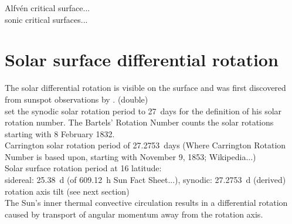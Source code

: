 Alfvén critical surface...\\
sonic critical surfaces...\\







\section{Solar surface differential rotation}
\label{sec:solar_surface_differential_rotation}

The solar differential rotation is visible on the surface and was first discovered from sunspot observations by \citet{Scheiner1630}. (double)\\

\citet{Bartels1934} set the synodic solar rotation period to 27~days for the definition of his solar rotation number. The Bartels' Rotation Number counts the solar rotations starting with 8 February 1832.\\
Carrington solar rotation period of 27.2753~days (Where Carrington Rotation Number is based upon, starting with November 9, 1853; Wikipedia...)\\

Solar surface rotation period at 16\degree{} latitude:\\
sidereal: 25.38~d (of 609.12~h Sun Fact Sheet...), synodic: 27.2753~d (derived)\\

rotation axis tilt (see next section)\\

The Sun's inner thermal convective circulation results in a differential rotation caused by transport of angular momentum away from the rotation axis.

